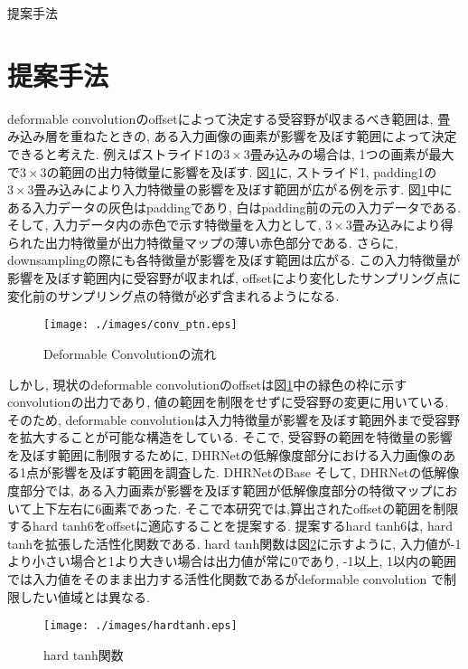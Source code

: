 \begin{chapter}{提案手法}
\section{提案手法}\label{sec:teian}
deformable convolutionのoffsetによって決定する受容野が収まるべき範囲は, 畳み込み層を重ねたときの, ある入力画像の画素が影響を及ぼす範囲によって決定できると考えた. 例えばストライド1の$3\times3$畳み込みの場合は, 1つの画素が最大で$3\times3$の範囲の出力特徴量に影響を及ぼす. 図\ref{fig:conv_ptn}に, ストライド1, padding1の$3\times3$畳み込みにより入力特徴量の影響を及ぼす範囲が広がる例を示す. 図\ref{fig:conv_ptn}中にある入力データの灰色はpaddingであり, 白はpadding前の元の入力データである. そして, 入力データ内の赤色で示す特徴量を入力として, $3\times3$畳み込みにより得られた出力特徴量が出力特徴量マップの薄い赤色部分である. さらに, downsamplingの際にも各特徴量が影響を及ぼす範囲は広がる. この入力特徴量が影響を及ぼす範囲内に受容野が収まれば, offsetにより変化したサンプリング点に変化前のサンプリング点の特徴が必ず含まれるようになる. \\
\begin{figure}[H]
  \centering
  \texttt{[image: ./images/conv\_ptn.eps]}
  \caption{Deformable Convolutionの流れ\cite{defconv}}
  \label{fig:conv_ptn}
\end{figure}
しかし, 現状のdeformable convolutionのoffsetは図\ref{fig:conv_ptn}中の緑色の枠に示すconvolutionの出力であり, 値の範囲を制限をせずに受容野の変更に用いている. そのため, deformable convolutionは入力特徴量が影響を及ぼす範囲外まで受容野を拡大することが可能な構造をしている.  そこで, 受容野の範囲を特徴量の影響を及ぼす範囲に制限するために, DHRNetの低解像度部分における入力画像のある1点が影響を及ぼす範囲を調査した. DHRNetのBase
そして, DHRNetの低解像度部分では, ある入力画素が影響を及ぼす範囲が低解像度部分の特徴マップにおいて上下左右に6画素であった. そこで本研究では,算出されたoffsetの範囲を制限するhard tanh6をoffsetに適応することを提案する. 提案するhard tanh6は, hard tanh\cite{raghu2017expressive}を拡張した活性化関数である.  hard tanh関数は図\ref{fig:hardtanh}に示すように, 入力値が-1より小さい場合と1より大きい場合は出力値が常に0であり, -1以上, 1以内の範囲では入力値をそのまま出力する活性化関数であるがdeformable convolution で制限したい値域とは異なる. 

\begin{figure}[H]
  \centering
  \texttt{[image: ./images/hardtanh.eps]}
  \caption{hard tanh関数}
  \label{fig:hardtanh}
\end{figure}


\end{chapter}
